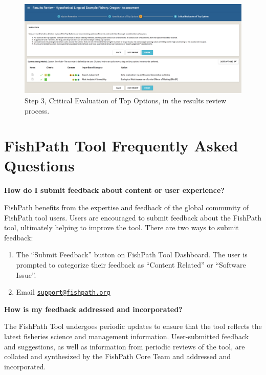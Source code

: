 \documentclass[
  11pt,
]{book}
\providecommand{\tightlist}{%
  \setlength{\itemsep}{0pt}\setlength{\parskip}{0pt}}
\begin{document}
\begin{figure}

{\centering \includegraphics[width=0.95\linewidth]{images/review-step-3} 

}

\caption{Step 3, Critical Evaluation of Top Options, in the results review process.}\label{fig:review-step-3}
\end{figure}

\hypertarget{appendix-appendix}{%
\appendix}


\hypertarget{fishpath-tool-frequently-asked-questions}{%
\chapter{FishPath Tool Frequently Asked Questions}\label{fishpath-tool-frequently-asked-questions}}

\textbf{How do I submit feedback about content or user experience?}

FishPath benefits from the expertise and feedback of the global community of FishPath tool users. Users are encouraged to submit feedback about the FishPath tool, ultimately helping to improve the tool. There are two ways to submit feedback:

\begin{enumerate}
\def\labelenumi{\arabic{enumi}.}
\tightlist
\item
  The ``Submit Feedback'' button on FishPath Tool Dashboard. The user is prompted to categorize their feedback as ``Content Related'' or ``Software Issue''.
\item
  Email \href{mailto:support@fishpath.org}{\nolinkurl{support@fishpath.org}}
\end{enumerate}

\textbf{How is my feedback addressed and incorporated?}

The FishPath Tool undergoes periodic updates to ensure that the tool reflects the latest fisheries science and management information. User-submitted feedback and suggestions, as well as information from periodic reviews of the tool, are collated and synthesized by the FishPath Core Team and addressed and incorporated.
\end{document}
